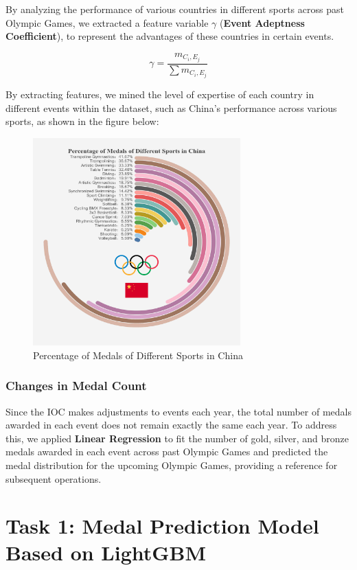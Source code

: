 \documentclass[12pt]{article}  %
\begin{document}
By analyzing the performance of various countries in different sports across past Olympic Games, we extracted a feature variable $\gamma$ (\textbf{Event Adeptness Coefficient}), to represent the advantages of these countries in certain events.

\begin{equation}
	\gamma = \frac{m_{C_i,E_j}}{\sum m_{C_i,E_j}}
\end{equation}





By extracting features, we mined the level of expertise of each country in different events within the dataset, such as China's performance across various sports, as shown in the figure below:

\begin{figure}[H]
	\centering
	\includegraphics[width=8cm]{img/Percentage.jpg}
	\caption{Percentage of Medals of Different Sports in China}
	\label{fig:aa}
\end{figure}


\subsubsection{Changes in Medal Count}
Since the IOC makes adjustments to events each year, the total number of medals awarded in each event does not remain exactly the same each year. To address this, we applied\textbf{ Linear Regression} to fit the number of gold, silver, and bronze medals awarded in each event across past Olympic Games and predicted the medal distribution for the upcoming Olympic Games, providing a reference for subsequent operations.

\section{Task 1: Medal Prediction Model Based on LightGBM}
\end{document}

